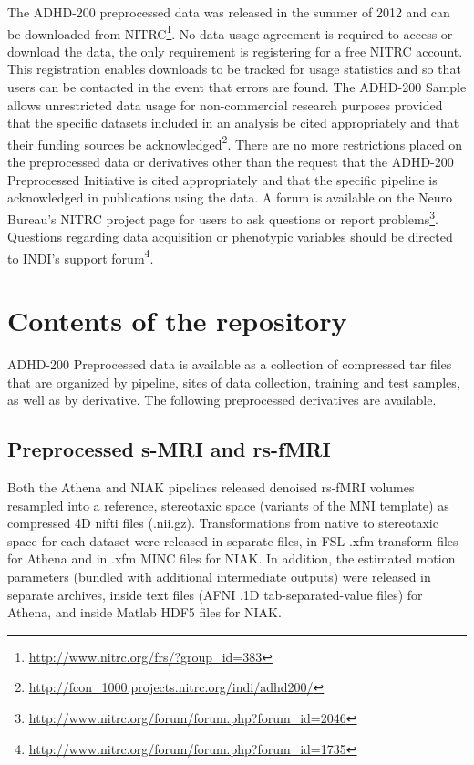 \documentclass[preprint,12pt,3p]{elsarticle}
\begin{document}
The ADHD-200 preprocessed data was released in the summer of 2012 and can be downloaded from NITRC\footnote{\url{http://www.nitrc.org/frs/?group_id=383}}. No data usage agreement is required to access or download the data, the only requirement is registering for a free NITRC account. This registration enables downloads to be tracked for usage statistics and so that users can be contacted in the event that errors are found. The ADHD-200 Sample allows unrestricted data usage for non-commercial research purposes provided that the specific datasets included in an analysis be cited appropriately and that their funding sources be acknowledged\footnote{\url{http://fcon_1000.projects.nitrc.org/indi/adhd200/}}. There are no more restrictions placed on the preprocessed data or derivatives other than the request that the ADHD-200 Preprocessed Initiative is cited appropriately and that the specific pipeline is acknowledged in publications using the data. A forum is available on the Neuro Bureau's NITRC project page for users to ask questions or report
problems\footnote{\url{http://www.nitrc.org/forum/forum.php?forum_id=2046}}. Questions regarding data acquisition or phenotypic variables should be directed to INDI's support forum\footnote{\url{http://www.nitrc.org/forum/forum.php?forum_id=1735}}. 


\section{Contents of the repository}

ADHD-200 Preprocessed data is available as a collection of compressed tar files that are organized by pipeline, sites of data collection, training and test samples, as well as by derivative. The following preprocessed derivatives are available.

\subsection{Preprocessed s-MRI and rs-fMRI} Both the Athena and NIAK pipelines released denoised rs-fMRI volumes resampled into a reference, stereotaxic space (variants of the MNI template) as compressed 4D nifti files (.nii.gz). Transformations from native to stereotaxic space for each dataset were released in separate files, in FSL .xfm transform files for Athena and in .xfm MINC files for NIAK. In addition, the estimated motion parameters (bundled with additional intermediate outputs) were released in separate archives, inside text files (AFNI .1D tab-separated-value files) for Athena, and inside Matlab HDF5 files for NIAK. 
\end{document}
